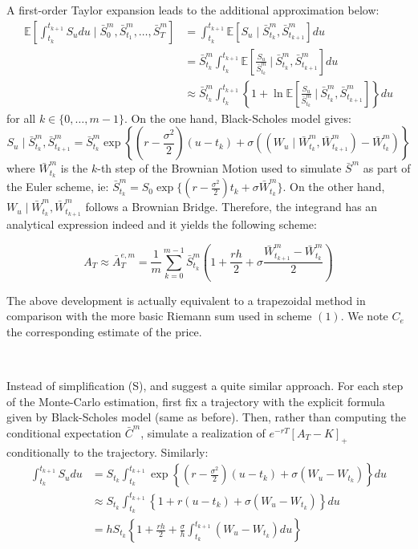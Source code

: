 \documentclass{article}
\begin{document}
A first-order Taylor expansion leads to the additional approximation below:
\begin{align*}
	\mathbb E \left[ \int_{t_k}^{t_{k+1}} S_u du \mid \bar S_0^m, \bar S_{t_1}^m, \dots, \bar S_T^m \right]
	&= \int_{t_k}^{t_{k+1}} \mathbb E \left[ S_u \mid \bar S_{t_k}^m, \bar S_{t_{k+1}}^m \right] du \\
	&= \bar S_{t_k}^m \int_{t_k}^{t_{k+1}} \mathbb E \left[ \frac{S_u}{\bar S_{t_k}^m}
		\ \Big\vert \ \bar S_{t_k}^m, \bar S_{t_{k+1}}^m \right] du \\
	&\approx
		\bar S_{t_k}^m \int_{t_k}^{t_{k+1}} \left\{ 1 + \ln \mathbb E \left[ \frac{S_u}{\bar S_{t_k}^m}
		\ \Big\vert \ \bar S_{t_k}^m, \bar S_{t_{k+1}}^m \right] \right\} du
\end{align*}
for all $k \in \{ 0, \dots, m - 1 \}$. On the one hand, Black-Scholes model gives:
\[
	S_u \mid \bar S_{t_k}^m, \bar S_{t_{k+1}}^m = \bar S_{t_k}^m \exp
	\left\{ \left( r - \frac{\sigma^2}{2} \right) (u - t_k) + \sigma
	\left ( \left( W_u \mid \bar W_{t_k}^m, \bar W_{t_{k+1}}^m \right) - \bar W_{t_k}^m \right) \right\}
\]
where $\bar W_{t_k}^m$ is the $k$-th step of the Brownian Motion used to simulate $\bar S^m$ as
part of the Euler scheme, ie:
$\bar S_{t_k}^m = S_0 \exp \{ ( r - \frac{\sigma^2}{2} ) t_k + \sigma \bar W_{t_k}^m \}$.
On the other hand, $W_u \mid \bar W_{t_k}^m, \bar W_{t_{k+1}}^m$ follows a Brownian Bridge.
Therefore, the integrand has an analytical expression indeed and it yields the following scheme:

\begin{equation}
    A_T \approx \bar A_T^{e, m} = \frac{1}{m} \sum_{k=0}^{m-1} \bar S_{t_k}^m
    	\left( 1 + \frac{rh}{2} + \sigma \frac{\bar W_{t_{k+1}}^m - \bar W_{t_k}^m}{2} \right) \tag{2}
\end{equation}

The above development is actually equivalent to a trapezoidal method in comparison with the more
basic Riemann sum used in scheme $(1)$. We note $C_e$ the corresponding estimate of the price.

\

Instead of simplification (S), \cite{Bouchard} and \cite{main} suggest a quite similar approach. For each step
of the Monte-Carlo estimation, first fix a trajectory with the explicit formula given by Black-Scholes model
(same as before). Then, rather than computing the conditional expectation $\bar C^m$, simulate a realization of
$e^{-rT} \left[ A_T - K \right]_+$ conditionally to the trajectory. Similarly:
\begin{align*}
	\int_{t_k}^{t_{k+1}} S_u du
	&= S_{t_k} \int_{t_k}^{t_{k+1}} \exp \left\{ \left( r - \frac{\sigma^2}{2} \right) (u - t_k) + \sigma
	\left( W_u - W_{t_k} \right) \right\} du \\
	&\approx
	S_{t_k} \int_{t_k}^{t_{k+1}} \left\{ 1 + r (u - t_k) + \sigma \left( W_u - W_{t_k} \right) \right\} du \\
	&= h S_{t_k} \left\{ 1 + \frac{rh}{2} + \frac{\sigma}{h} \int_{t_k}^{t_{k+1}} \left( W_u - W_{t_k} \right) du \right\}
\end{align*}
\end{document}
